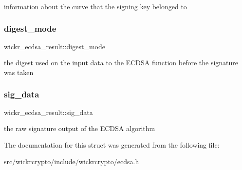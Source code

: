 information about the curve that the signing key belonged to \mbox{\label{structwickr__ecdsa__result_a33c820900693a016ac43702e76b54cff}} 
\subsubsection{\texorpdfstring{digest\_mode}{digest\_mode}}
{\footnotesize\ttfamily wickr\+\_\+ecdsa\+\_\+result\+::digest\+\_\+mode}

the digest used on the input data to the E\+C\+D\+SA function before the signature was taken \mbox{\label{structwickr__ecdsa__result_ada32a17d9f713f84142fc6a338ebcc48}} 
\subsubsection{\texorpdfstring{sig\_data}{sig\_data}}
{\footnotesize\ttfamily wickr\+\_\+ecdsa\+\_\+result\+::sig\+\_\+data}

the raw signature output of the E\+C\+D\+SA algorithm 

The documentation for this struct was generated from the following file\+:\begin{DoxyCompactItemize}
\item 
src/wickrcrypto/include/wickrcrypto/ecdsa.\+h\end{DoxyCompactItemize}
